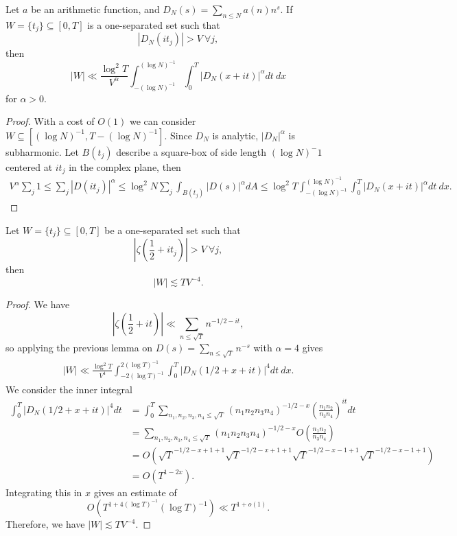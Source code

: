 \begin{lemma}
    Let $a$ be an arithmetic function, and $D_N(s)=\sum_{n\leq N}a(n)n^{s}.$
    If $W = \{t_j\}\subseteq [0,T]$ is a one-separated set such that \[
        |D_N(it_j)| > V \ \forall j,
    \]
    then \[
        |W|\ll \frac{\log^2 T}{V^\alpha} \int_{-(\log N)^{-1}}^{(\log N)^{-1}}
        \int_{0}^{T} |D_N(x+it)|^\alpha dt \ dx
        \]
    for $\alpha > 0$.
\end{lemma}
\begin{proof}
    With a cost of $O(1)$ we can consider $W\subseteq [(\log N)^{-1}, T-(\log N)^{-1}]$.
    Since $D_N$ is analytic, $|D_N|^\alpha$ is subharmonic. Let $B(t_j)$ describe a square-box of side length $(\log N)^-1$ centered at $it_j$ in the complex plane, then \begin{align*}
        V^\alpha \sum_{j} 1 \leq \sum_{j}|D(it_j)|^\alpha \leq \log^2 N \sum_{j} \int_{B(t_j)} |D(s)|^\alpha dA \leq \log^2 T \int_{-(\log N)^{-1}}^{(\log N)^{-1}}
        \int_{0}^{T} |D_N(x+it)|^\alpha dt \ dx.
    \end{align*}
\end{proof}

\begin{corollary} \label{halflinebigvalue}
   Let $W = \{t_j\}\subseteq [0,T]$ be a one-separated set such that \[
        \left|\zeta\left(\frac{1}{2}+it_j\right)\right|>V \ \forall j,
    \]
    then \[
    |W|\lesssim TV^{-4}.
    \]
\end{corollary}
\begin{proof}
    We have \[
        \left|\zeta\left(\frac{1}{2}+it\right)\right|\ll \sum_{n\leq \sqrt{T}}n^{-1/2-it},
    \]
    so applying the previous lemma on $D(s)=\sum_{n\leq \sqrt{T}}n^{-s}$ with $\alpha=4$ gives \begin{align*}
        |W|\ll \frac{\log ^2 T}{V^4} \int_{-2(\log T)^{-1}}^{2(\log T)^{-1}}
        \int_{0}^{T} |D_N(1/2+x+it)|^4 dt \ dx.
    \end{align*}
    We consider the inner integral \begin{align*}
        \int_{0}^{T} |D_N(1/2+x+it)|^4 dt &=
        \int_{0}^{T} \sum_{n_1,n_2,n_3,n_4\leq \sqrt{T}}(n_1n_2n_3n_4)^{-1/2-x}\left(\frac{n_1n_2}{n_3n_4}\right)^{it} dt\\
        &=\sum_{n_1,n_2,n_3,n_4\leq \sqrt{T}}(n_1n_2n_3n_4)^{-1/2-x}O\left(\frac{n_1n_2}{n_3n_4}\right)\\
        &=O(\sqrt{T}^{-1/2-x+1+1}\sqrt{T}^{-1/2-x+1+1}\sqrt{T}^{-1/2-x-1+1}\sqrt{T}^{-1/2-x-1+1})\\
        &=O(T^{1-2x}).
    \end{align*}
    Integrating this in $x$ gives an estimate of \[
    O(T^{1+4(\log T)^{-1}}(\log T)^{-1})\ll T^{1+o(1)}    .\]
    Therefore, we have $|W|\lesssim TV^{-4}$.
\end{proof}

